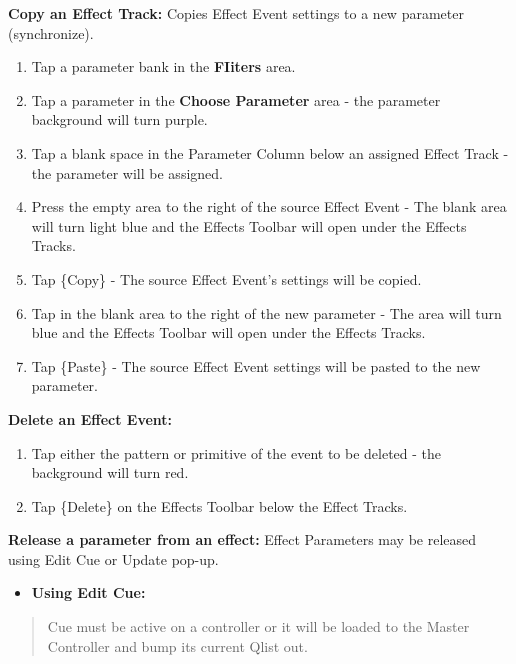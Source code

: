 \documentclass[
]{article}
\providecommand{\tightlist}{%
  \setlength{\itemsep}{0pt}\setlength{\parskip}{0pt}}
\begin{document}
\textbf{Copy an Effect Track:} Copies Effect Event settings to a new parameter (synchronize).

\begin{enumerate}
\def\labelenumi{\arabic{enumi}.}
\item
  Tap a parameter bank in the \textbf{FIiters} area.
\item
  Tap a parameter in the \textbf{Choose Parameter} area - the parameter background will turn purple.
\item
  Tap a blank space in the Parameter Column below an assigned Effect Track - the parameter will be assigned.
\item
  Press the empty area to the right of the source Effect Event - The blank area will turn light blue and the Effects Toolbar will open under the Effects Tracks.
\item
  Tap \{Copy\} - The source Effect Event's settings will be copied.
\item
  Tap in the blank area to the right of the new parameter - The area will turn blue and the Effects Toolbar will open under the Effects Tracks.
\item
  Tap \{Paste\} - The source Effect Event settings will be pasted to the new parameter.
\end{enumerate}

\textbf{Delete an Effect Event:}

\begin{enumerate}
\def\labelenumi{\arabic{enumi}.}
\item
  Tap either the pattern or primitive of the event to be deleted - the background will turn red.
\item
  Tap \{Delete\} on the Effects Toolbar below the Effect Tracks.
\end{enumerate}

\textbf{Release a parameter from an effect:} Effect Parameters may be released using Edit Cue or Update pop-up.

\begin{itemize}
\tightlist
\item
  \textbf{Using Edit Cue:}
\end{itemize}

\begin{quote}
{Cue must be active on a controller or it will be loaded to the Master Controller and bump its current Qlist out.}
\end{quote}
\end{document}
